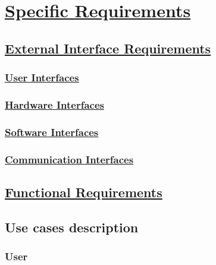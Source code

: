 \section[Specific Requirements]{\hyperlink{toc}{Specific Requirements}}

\subsection[External Interface Requirements]{\hyperlink{toc}{External Interface Requirements}}
	\subsubsection[User Interfaces]{\hyperlink{toc}{User Interfaces}}
	\subsubsection[Hardware Interfaces]{\hyperlink{toc}{Hardware Interfaces}}
	\subsubsection[Software Interfaces]{\hyperlink{toc}{Software Interfaces}}
	\subsubsection[Communication Interfaces]{\hyperlink{toc}{Communication Interfaces}}

\subsection[Functional Requirements]{\hyperlink{toc}{Functional Requirements}}

\subsection{Use cases description}
	\subsubsection{User}
	
